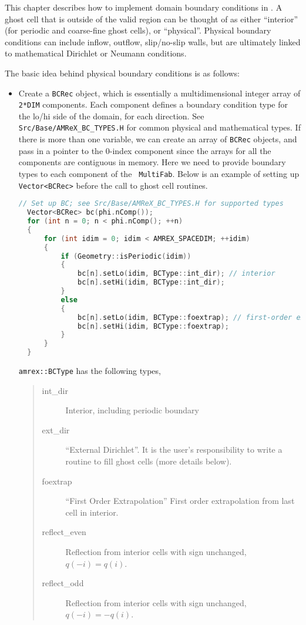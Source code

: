 This chapter describes how to implement domain boundary conditions in \amrex.
A ghost cell that is outside of the valid region can be thought of as either
``interior'' (for periodic and coarse-fine ghost cells), or ``physical''.
Physical boundary conditions can include inflow, outflow, slip/no-slip walls,
but are ultimately linked to mathematical Dirichlet or Neumann conditions.

The basic idea behind physical boundary conditions is as follows:
\begin{itemize}

\item Create a {\tt BCRec} object, which is essentially a multidimensional integer array of
{\tt 2*DIM} components.  Each component defines a boundary condition type for
the lo/hi side of the domain, for each direction.
See {\tt Src/Base/AMReX\_BC\_TYPES.H} for common physical and mathematical types.
If there is more than one variable, we can create an array of {\tt BCRec} objects,
and pass in a pointer to the 0-index component since the arrays for all the 
components are contiguous in memory.
Here we need to provide boundary types to each component of the {\tt
MultiFab}.  Below is an example of setting up {\tt Vector<BCRec>}
before the call to ghost cell routines.
\begin{lstlisting}[language=cpp]
  // Set up BC; see Src/Base/AMReX_BC_TYPES.H for supported types
  Vector<BCRec> bc(phi.nComp());
  for (int n = 0; n < phi.nComp(); ++n)
  {
      for (int idim = 0; idim < AMREX_SPACEDIM; ++idim)
      {
          if (Geometry::isPeriodic(idim))
          {
              bc[n].setLo(idim, BCType::int_dir); // interior
              bc[n].setHi(idim, BCType::int_dir);
          }
          else
          {
              bc[n].setLo(idim, BCType::foextrap); // first-order extrapolation
              bc[n].setHi(idim, BCType::foextrap);
          }
      }
  }
\end{lstlisting}
{\tt amrex::BCType} has the following types,
\begin{quote}
\begin{description}
\item [int\_dir] Interior, including periodic boundary
\item [ext\_dir] ``External Dirichlet''.  It is the user's responsibility to write a routine
to fill ghost cells (more details below).
\item [foextrap] ``First Order Extrapolation'' 
First order extrapolation from last cell in interior.
\item [reflect\_even] Reflection from interior cells with sign
  unchanged, $q(-i) = q(i)$.
\item [reflect\_odd] Reflection from interior cells with sign
  unchanged, $q(-i) = -q(i)$.
\end{description}
\end{quote}


\end{itemize}
